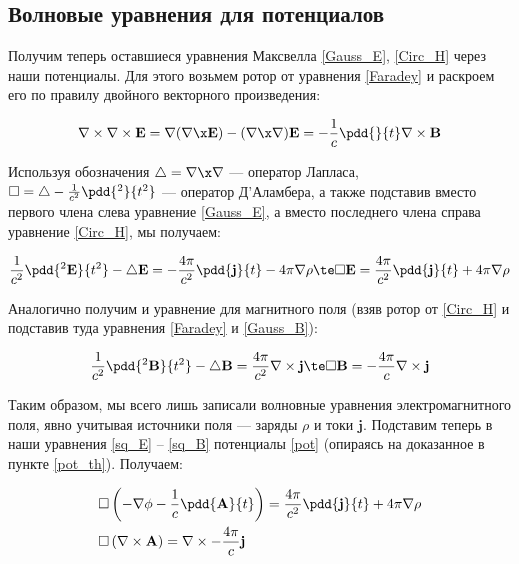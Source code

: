 \documentclass[12pt]{kiarticle}
\begin{document}
\subsection{Волновые уравнения для потенциалов}

Получим теперь оставшиеся уравнения Максвелла \eqref{Gauss_E}, \eqref{Circ_H} через наши потенциалы. Для этого возьмем ротор от уравнения \eqref{Faradey} и раскроем его по правилу двойного векторного произведения:

\begin{equation}\label{}
\nabla \times \nabla \times \mathbf{E} = \nabla (\nabla \x \mathbf{E}) - (\nabla \x \nabla) \mathbf{E} = - \dfrac{1}{c} \pdd{}{t}\nabla \times \mathbf{B}
\end{equation}

Используя обозначения $ \triangle = \nabla \x \nabla $  --- оператор Лапласа, $ \square = \triangle -  \frac{1}{c^2}\pdd{^2}{t^2}$ --- оператор Д'Аламбера, а также подставив вместо первого члена слева уравнение \eqref{Gauss_E}, а вместо последнего члена справа уравнение \eqref{Circ_H}, мы получаем:

\begin{equation}\label{sq_E}
\dfrac{1}{c^2}\pdd{^2\mathbf{E}}{t^2} - \triangle \mathbf{E} = - \dfrac{4\pi}{c^2} \pdd{\mathbf{j}}{t} - 4 \pi \nabla \rho \te \square \mathbf{E} = \dfrac{4\pi}{c^2} \pdd{\mathbf{j}}{t} + 4 \pi \nabla \rho
\end{equation}

Аналогично получим и уравнение для магнитного поля (взяв ротор от \eqref{Circ_H} и подставив туда уравнения \eqref{Faradey} и \eqref{Gauss_B}):

\begin{equation}\label{sq_B}
\dfrac{1}{c^2}\pdd{^2\mathbf{B}}{t^2} - \triangle \mathbf{B} = \dfrac{4\pi}{c^2} \nabla \times \mathbf{j} \te \square \mathbf{B} = - \dfrac{4\pi}{c} \nabla \times \mathbf{j}
\end{equation}

Таким образом, мы всего лишь записали волновные уравнения электромагнитного поля, явно учитывая источники поля --- заряды $ \rho $ и токи $ \mathbf{j} $. Подставим теперь в наши уравнения \eqref{sq_E} -- \eqref{sq_B} потенциалы \eqref{pot} (опираясь на доказанное в пункте \ref{pot_th}). Получаем:

\begin{equation}\label{sq}
\left.
\begin{aligned}
& \square \left( - \nabla \phi  - \dfrac{1}{c} \pdd{\mathbf{A}}{t} \right) = \dfrac{4\pi}{c^2} \pdd{\mathbf{j}}{t} + 4 \pi \nabla \rho \\
& \square \left( \nabla \times \mathbf{A} \right) = \nabla \times - \dfrac{4\pi}{c}\mathbf{j} \\
\end{aligned}
\right.
\end{equation}
\end{document}
